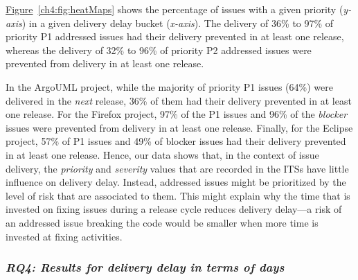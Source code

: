 \hyperref[ch4:fig:heatMaps]{Figure}~\ref{ch4:fig:heatMaps} shows the percentage of
issues with a given priority (\textit{y-axis}) in a given delivery delay bucket
(\textit{x-axis}). The delivery of 36\% to 97\% of priority P1 addressed issues
had their delivery prevented in at least one release, whereas the delivery
of 32\% to 96\% of priority P2 addressed issues were prevented from delivery in
at least one release. 

In the ArgoUML project, while the majority of priority P1 issues (64\%) were
delivered in the \textit{next} release, 36\% of them had their delivery
prevented in at least one release. For the Firefox project, 97\% of the P1
issues and 96\% of the \textit{blocker} issues were prevented from delivery
in at least one release. Finally, for the Eclipse project, 57\% of P1 issues and
49\% of blocker issues had their delivery prevented in at least one release.
Hence, our data shows that, in the context of issue delivery, the
\textit{priority} and \textit{severity} values that are recorded in the ITSs
have little influence on delivery delay. Instead, addressed issues might be
prioritized by the level of risk that are associated to them. This might explain
why the time that is invested on fixing issues during a release cycle reduces
delivery delay---a risk of an addressed issue breaking the code would be smaller
when more time is invested at fixing activities. 


\subsubsection*{\textbf{\textit{RQ4: Results for delivery delay in terms of days}}}

